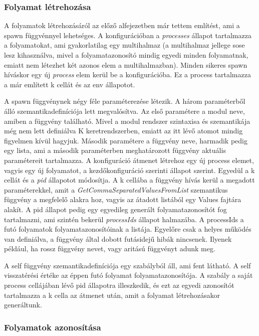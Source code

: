 \subsubsection{Folyamat létrehozása}
A folyamatok létrehozásáról az előző alfejezetben már tettem említést, ami a spawn függvénnyel lehetséges. A konfigurációban a \textit{processes} állapot tartalmazza a folyamatokat, ami gyakorlatilag egy multihalmaz (a multihalmaz jellege sose lesz kihasználva, mivel a folyamatazonosító mindig egyedi minden folyamatnak, emiatt nem létezhet két azonos elem a multihalmazban). Minden sikeres spawn híváskor egy új \textit{process} elem kerül be a konfigurációba. Ez a process tartalmazza a már említett k cellát és az env állapotot.

A spawn függvénynek négy féle paraméterezése létezik. A három paraméterből álló szemantikadefiníciója lett megvalósítva. Az első paramétere a modul neve, amiben a függvény található. Mivel a modul rendszer szintaxisa és szemantikája még nem lett definiálva K keretrendszerben, emiatt az itt lévő atomot mindig figyelmen kívül hagyjuk. Második paramétere a függvény neve, harmadik pedig egy lista, ami a második paraméterben meghatározott függvény aktuális paramétereit tartalmazza. A konfiguráció átmenet létrehoz egy új process elemet, vagyis egy új folyamatot, a kezdőkonfiguráció szerinti állapot szerint. Egyedül a k cellát és a \textit{pid} állapotot módosítja. A k cellába a függvény hívás kerül a megadott paraméterekkel, amit a \textit{GetCommaSeparatedValuesFromList} szemantikus függvény a megfelelő alakra hoz, vagyis az átadott listából egy Values fajtára alakít. A pid állapot pedig egy egyedileg generált folyamatazonosítót fog tartalmazni, ami szintén bekerül \textit{processIds} állapot halmazába. A processIds a futó folyamatok folyamatazonosítóinak a listája. Egyelőre csak a helyes működés van definiálva, a függvény által dobott futásidejű hibák nincsenek. Ilyenek például, ha rossz függvény nevet, vagy aritású függvényt adunk meg.

\vfill %



A self függvény szemantikadefiníciója egy szabályból áll, ami fent látható. A self visszatérési értéke az éppen futó folyamat folyamatazonosítója. A szabály a saját process cellájában lévő pid állapotra illeszkedik, és ezt az egyedi azonosítót tartalmazza a k cella az átmenet után, amit a folyamat létrehozásakor generáltunk.

\subsubsection{Folyamatok azonosítása}

